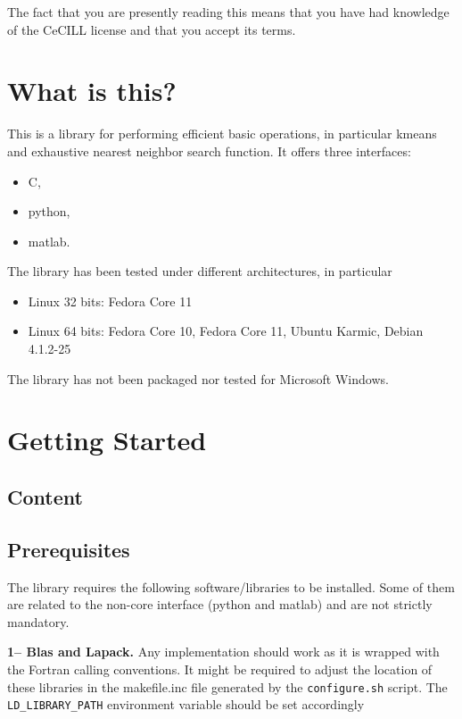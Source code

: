 \documentclass[a4paper,11pt,notitlepage,final,twoside]{report}
\begin{document}
The fact that you are presently reading this means that you have had
knowledge of the CeCILL license and that you accept its terms.


\tableofcontents            %


\chapter{What is this?}

This is a library for performing efficient basic operations, 
in particular kmeans and exhaustive nearest neighbor search function.
It offers three interfaces: 
\begin{itemize}
\item C, 
\item python, 
\item matlab.
\end{itemize}

The library has been tested under different architectures, in particular
\begin{itemize}
\item Linux 32 bits: Fedora Core 11
\item Linux 64 bits: Fedora Core 10, Fedora Core 11, Ubuntu Karmic, Debian 4.1.2-25
\end{itemize}

The library has not been packaged nor tested for Microsoft Windows. 



\chapter{Getting Started}

\section{Content}

\section{Prerequisites}

The library requires the following software/libraries to be installed. 
Some of them are related to the non-core interface (python and matlab) 
and are not strictly mandatory. 
\bigskip

{\bf 1-- Blas and Lapack. } 
Any implementation should work as it is
wrapped with the Fortran calling conventions. 
It might be required to adjust the location of these libraries in 
the makefile.inc file generated by the \texttt{configure.sh} script. 
The \texttt{LD\_LIBRARY\_PATH} environment variable should be set accordingly
\bigskip
\end{document}
